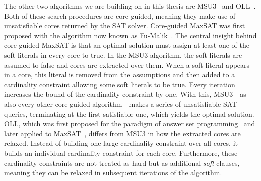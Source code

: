 The other two algorithms we are building on in this thesis are MSU3~\autocite{DBLP:journals/corr/abs-0712-1097} and OLL~\autocite{DBLP:conf/cp/MorgadoDM14,DBLP:journals/jsat/IgnatievMM19}.
Both of these search procedures are core-guided, meaning they make use of unsatisfiable cores returned by the SAT solver.
Core-guided MaxSAT was first proposed with the algorithm now known as Fu-Malik~\autocite{DBLP:conf/sat/FuM06}.
The central insight behind core-guided MaxSAT is that an optimal solution must assign at least one of the soft literals in every core to true.
In the MSU3 algorithm, the soft literals are assumed to false and cores are extracted over them.
When a soft literal appears in a core, this literal is removed from the assumptions and then added to a cardinality constraint allowing some soft literals to be true.
Every iteration increases the bound of the cardinality constraint by one.
With this, MSU3---as also every other core-guided algorithm---makes a series of unsatisfiable SAT queries, terminating at the first satisfiable one, which yields the optimal solution.
OLL, which was first proposed for the paradigm of answer set programming~\autocite{DBLP:conf/iclp/AndresKMS12} and later applied to MaxSAT~\autocite{DBLP:conf/cp/MorgadoDM14,DBLP:journals/jsat/IgnatievMM19}, differs from MSU3 in how the extracted cores are relaxed.
Instead of building one large cardinality constraint over all cores, it builds an individual cardinality constraint for each core.
Furthermore, these cardinality constraints are not treated as hard but as additional \emph{soft} clauses, meaning they can be relaxed in subsequent iterations of the algorithm.